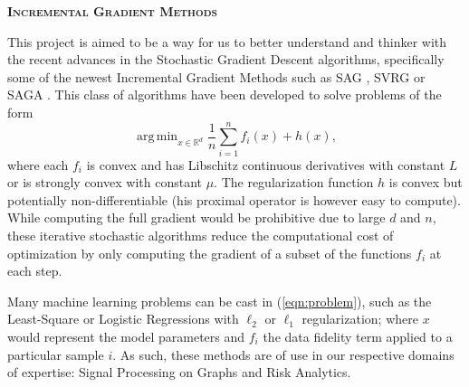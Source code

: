 \documentclass[a4paper,11pt]{article}
\DeclareMathOperator*{\argmin}{arg\,min}
\newcommand{\R}{\mathbb{R}}
\newcommand{\eqnref}[1]{(\ref{eqn:#1})}
\begin{document}
\begin{center} 
	\Large{\textbf{\textsc{Incremental Gradient Methods}}}
\end{center}

This project is aimed to be a way for us to better understand and thinker with
the recent advances in the Stochastic Gradient Descent algorithms, specifically
some of the newest Incremental Gradient Methods such as SAG
\cite{schmidt_minimizing_2013}, SVRG \cite{johnson_accelerating_2013} or SAGA
\cite{defazio_saga_2014}. This class of algorithms have been developed to solve
problems of the form
\begin{equation} \label{eqn:problem}
	\argmin_{x \in \R^d} \frac{1}{n} \sum_{i=1}^n f_i(x) + h(x),
\end{equation}
where each $f_i$ is convex and has Libschitz continuous derivatives with
constant $L$ or is strongly convex with constant $\mu$. The regularization
function $h$ is convex but potentially non-differentiable (his proximal operator
is however easy to compute). While computing the full gradient would be
prohibitive due to large $d$ and $n$, these iterative stochastic algorithms
reduce the computational cost of optimization by only computing the gradient of
a subset of the functions $f_i$ at each step.

Many machine learning problems can be cast in \eqnref{problem}, such as the
Least-Square or Logistic Regressions with $\ell_2$ or $\ell_1$ regularization;
where $x$ would represent the model parameters and $f_i$ the data fidelity term
applied to a particular sample $i$. As such, these methods are of use in our
respective domains of expertise: Signal Processing on Graphs and Risk Analytics.
\end{document}
